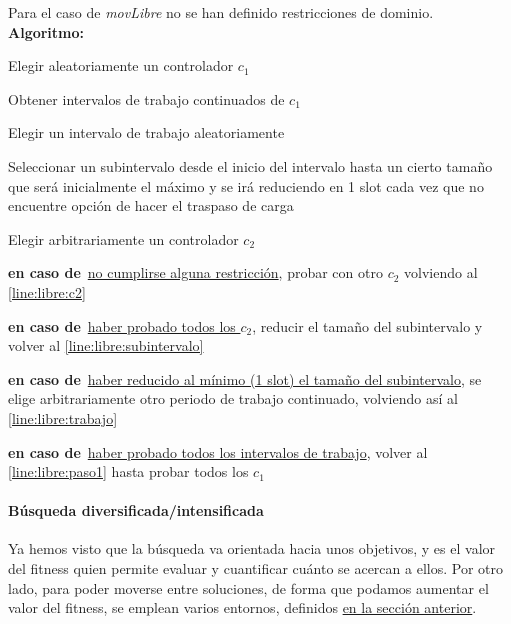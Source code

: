 Para el caso de \textit{movLibre} no se han definido restricciones de dominio.
\newpage
\textbf{Algoritmo:}
\SetAlgoNoLine
\LinesNumbered
\SetAlgoNoEnd
\DontPrintSemicolon
\begin{algorithm}[h]
    \label{algoritmo:movLibre}
    \SetAlgoNoEnd
    Elegir aleatoriamente un controlador $c_1$  \label{line:libre:paso1}\;
    \algovspace

    Obtener intervalos de trabajo continuados de $c_1$\;
    \algovspace

    Elegir un intervalo de trabajo aleatoriamente \label{line:libre:trabajo}\;
    \algovspace

    Seleccionar un subintervalo desde el inicio del intervalo hasta un cierto tamaño que será inicialmente el máximo y se irá reduciendo en 1 slot \newline cada vez que no encuentre opción de hacer el traspaso de carga \label{line:libre:subintervalo}\;
    \algovspace

    Elegir arbitrariamente un controlador $c_2$ \label{line:libre:c2}\;
    \algovspace

    \algovspace

    \textbf{en caso de\,} \underline{no cumplirse alguna restricción}, probar con otro $c_2$ volviendo al \autoref{line:libre:c2}\;
    \algovspace

    \textbf{en caso de\,} \underline{haber probado todos los $c_2$}, reducir el tamaño del subintervalo y volver al \autoref{line:libre:subintervalo}\;
    \algovspace

    \textbf{en caso de\,} \underline{haber reducido al mínimo (1 slot) el tamaño del subintervalo}, se elige arbitrariamente otro periodo de trabajo continuado, volviendo así al \autoref{line:libre:trabajo}\;
    \algovspace

    \textbf{en caso de\,} \underline{haber probado todos los intervalos de trabajo}, volver al \autoref{line:libre:paso1} hasta probar todos los $c_1$\;
    \algovspace
\end{algorithm}


\paragraph{Búsqueda diversificada/intensificada} \label{capitulo:3:busqueda-divers-intens}
Ya hemos visto que la búsqueda va orientada hacia unos objetivos, y es el valor del fitness quien permite evaluar y cuantificar cuánto se acercan a ellos. Por otro lado, para poder moverse entre soluciones, de forma que podamos aumentar
el valor del fitness, se emplean varios entornos, definidos \hyperref[paragraph:entornos]{en la sección anterior}.

